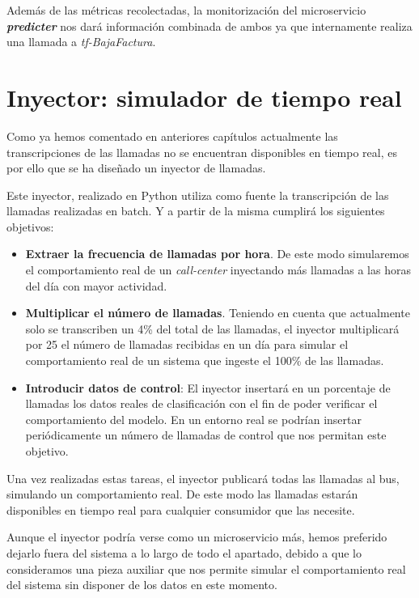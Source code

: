 Además de las métricas recolectadas, la monitorización del microservicio \textit{\textbf{predicter}} nos dará información combinada de ambos ya que internamente realiza una llamada a \textit{tf-BajaFactura}.



\section{Inyector: simulador de tiempo real}
Como ya hemos comentado en anteriores capítulos actualmente las transcripciones de las llamadas no se encuentran disponibles en tiempo real, es por ello que se ha diseñado un inyector de llamadas.

Este inyector, realizado en Python utiliza como fuente la transcripción de las llamadas realizadas en batch. Y a partir de la misma cumplirá los siguientes objetivos: 

\begin{itemize}
	\item \textbf{ Extraer la frecuencia de llamadas por hora}. De este modo simularemos el comportamiento real de un \textit{call-center} inyectando más llamadas a las horas del día con mayor actividad.
	\item \textbf{Multiplicar el número de llamadas}. Teniendo en cuenta que actualmente solo se transcriben un 4\% del total de las llamadas, el inyector multiplicará por 25 el número de llamadas recibidas en un día para simular el comportamiento real de un sistema que ingeste el 100\% de las llamadas.
	\item \textbf{Introducir datos de control}: El inyector insertará en un porcentaje de llamadas los datos reales de clasificación con el fin de poder verificar el comportamiento del modelo. En un entorno real se podrían insertar periódicamente un número de llamadas de control que nos permitan este objetivo.
	
\end{itemize}

Una vez realizadas estas tareas, el inyector publicará todas las llamadas al bus, simulando un comportamiento real. De este modo las llamadas estarán disponibles en tiempo real para cualquier consumidor que las necesite.

Aunque el inyector podría verse como un microservicio más, hemos preferido dejarlo fuera del sistema a lo largo de todo el apartado, debido a que lo consideramos una pieza auxiliar que nos permite simular el comportamiento real del sistema sin disponer de los datos en este momento.

